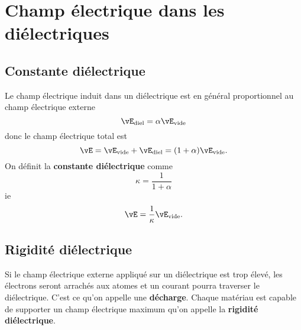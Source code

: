 \section{Champ électrique dans les diélectriques}


\subsection*{Constante diélectrique}


Le champ électrique induit dans un diélectrique est en général proportionnel au
champ électrique externe
$$\vE_\text{diel} = \alpha \vE_\text{vide}$$
donc le champ électrique total est
$$\vE = \vE_\text{vide} + \vE_\text{diel} = (1 + \alpha) \vE_\text{vide}.$$
On définit la \textbf{constante diélectrique} comme
$$\kappa = \frac{1}{1 + \alpha}$$
ie
$$\vE = \frac{1}{\kappa} \vE_\text{vide}.$$


\subsection*{Rigidité diélectrique}

Si le champ électrique externe appliqué sur un diélectrique est trop élevé, les
électrons seront arrachés aux atomes et un courant pourra traverser le
diélectrique. C'est ce qu'on appelle une \textbf{décharge}. Chaque matériau est
capable de supporter un champ électrique maximum qu'on appelle la
\textbf{rigidité diélectrique}.


